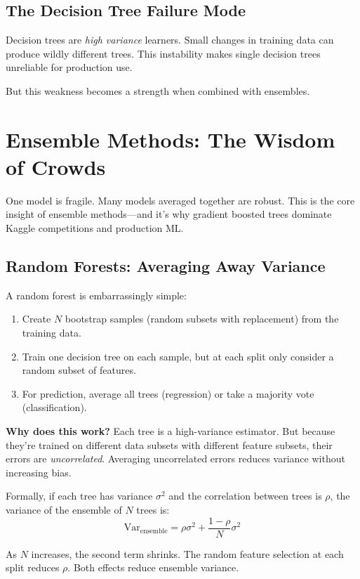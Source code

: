 \subsection{The Decision Tree Failure Mode}

Decision trees are \textit{high variance} learners. Small changes in training data can produce wildly different trees. This instability makes single decision trees unreliable for production use.

But this weakness becomes a strength when combined with ensembles.

\section{Ensemble Methods: The Wisdom of Crowds}

One model is fragile. Many models averaged together are robust. This is the core insight of ensemble methods---and it's why gradient boosted trees dominate Kaggle competitions and production ML.

\subsection{Random Forests: Averaging Away Variance}

A random forest is embarrassingly simple:

\begin{enumerate}
    \item Create $N$ bootstrap samples (random subsets with replacement) from the training data.
    \item Train one decision tree on each sample, but at each split only consider a random subset of features.
    \item For prediction, average all trees (regression) or take a majority vote (classification).
\end{enumerate}

\textbf{Why does this work?} Each tree is a high-variance estimator. But because they're trained on different data subsets with different feature subsets, their errors are \textit{uncorrelated}. Averaging uncorrelated errors reduces variance without increasing bias.

Formally, if each tree has variance $\sigma^2$ and the correlation between trees is $\rho$, the variance of the ensemble of $N$ trees is:
$$\text{Var}_{\text{ensemble}} = \rho \sigma^2 + \frac{1 - \rho}{N} \sigma^2$$

As $N$ increases, the second term shrinks. The random feature selection at each split reduces $\rho$. Both effects reduce ensemble variance.

